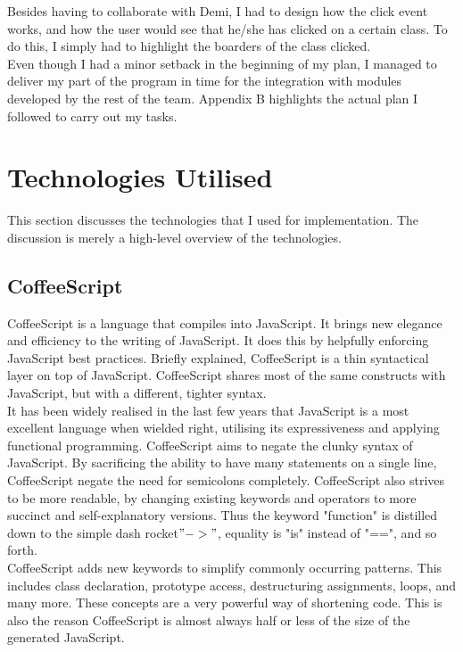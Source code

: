 \documentclass[a4paper,12pt]{article}
\begin{document}
\indent Besides having to collaborate with Demi, I had to design how the click event works, and how the user would see that he/she has clicked on a certain class. To do this, I simply had to highlight the boarders of the class clicked.\\

\indent Even though I had a minor setback in the beginning of my plan, I managed to deliver my part of the program in time for the integration with modules developed by the rest of the team. Appendix B highlights the actual plan I followed to carry out my tasks.

\section{Technologies Utilised}
This section discusses the technologies that I used for implementation. The discussion is merely a high-level overview of the technologies.
\subsection{CoffeeScript}
CoffeeScript is a language that compiles into JavaScript. It brings new elegance and efficiency to the writing of JavaScript. It does this by helpfully enforcing JavaScript best practices. Briefly explained, CoffeeScript is a thin syntactical layer on top of JavaScript. CoffeeScript shares most of the same constructs with JavaScript, but with a different, tighter syntax.\\

\indent It has been widely realised in the last few years that JavaScript is a most excellent language when wielded right, utilising its expressiveness and applying functional programming.
CoffeeScript aims to negate the clunky syntax of JavaScript. By sacrificing the ability to have many statements on a single line, CoffeeScript negate the need for semicolons completely. CoffeeScript also strives to be more readable, by changing existing keywords and operators to more succinct and self-explanatory versions. Thus the keyword "function" is distilled down to the simple dash rocket$ "->"$, equality is {"is"} instead of {"=="}, and so forth.\\

\indent CoffeeScript adds new keywords to simplify commonly occurring patterns. This includes class declaration, prototype access, destructuring assignments, loops, and many more. These concepts are a very powerful way of shortening code. This is also the reason CoffeeScript is almost always half or less of the size of the generated JavaScript.\\
\end{document}
